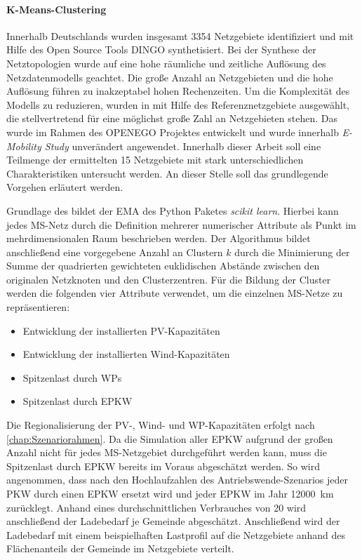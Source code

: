 \paragraph{K-Means-Clustering}

Innerhalb Deutschlands wurden insgesamt \num{3354} Netzgebiete \cite{Schachler} identifiziert und mit Hilfe des Open Source Tools \gls{DINGO} synthetisiert.
Bei der Synthese der Netztopologien wurde auf eine hohe räumliche und zeitliche Auflösung des Netzdatenmodells geachtet.
Die große Anzahl an Netzgebieten und die hohe Auflösung führen zu inakzeptabel hohen Rechenzeiten.
Um die Komplexität des Modells zu reduzieren, wurden in  mit Hilfe des \kmeans Referenznetzgebiete ausgewählt, die stellvertretend für eine möglichst große Zahl an Netzgebieten stehen.
Das \kmean wurde im Rahmen des \gls{OPENEGO} Projektes \cite{Mueller2019} entwickelt und wurde innerhalb \textit{E-Mobility Study} \cite{Schachler} unverändert angewendet.
Innerhalb dieser Arbeit soll eine Teilmenge der ermittelten \num{15} Netzgebiete mit stark unterschiedlichen Charakteristiken untersucht werden.
An dieser Stelle soll das grundlegende Vorgehen erläutert werden. \medskip

Grundlage des \kmeans bildet der \gls{EMA} des Python Paketes \textit{scikit learn}. \cite{scikit-learn2011}
Hierbei kann jedes \gls{MS}-Netz durch die Definition mehrerer numerischer Attribute als Punkt im mehrdimensionalen Raum beschrieben werden.
Der Algorithmus bildet anschließend eine vorgegebene Anzahl an Clustern $k$ durch die Minimierung der Summe der quadrierten gewichteten euklidischen Abstände zwischen den originalen Netzknoten und den Clusterzentren.
Für die Bildung der Cluster werden die folgenden vier Attribute verwendet, um die einzelnen \gls{MS}-Netze zu repräsentieren:

\begin{itemize}
	\item Entwicklung der installierten \gls{PV}-Kapazitäten
	\item Entwicklung der installierten Wind-Kapazitäten
	\item Spitzenlast durch \glspl{WP}
	\item Spitzenlast durch \gls{EPKW}
\end{itemize}

Die Regionalisierung der \gls{PV}-, Wind- und \gls{WP}-Kapazitäten erfolgt nach \autoref{chap:Szenariorahmen}.
Da die Simulation aller \gls{EPKW} aufgrund der großen Anzahl nicht für jedes \gls{MS}-Netzgebiet durchgeführt werden kann, muss die Spitzenlast durch \gls{EPKW} bereits im Voraus abgeschätzt werden.
So wird angenommen, dass nach den Hochlaufzahlen des Antriebswende-Szenarios jeder \gls{PKW} durch einen \gls{EPKW} ersetzt wird und jeder \gls{EPKW} im Jahr \SI{12000}{\km} zurücklegt.
Anhand eines durchschnittlichen Verbrauches von \SI{20}{\kwhkm} wird anschließend der Ladebedarf je Gemeinde abgeschätzt.
Anschließend wird der Ladebedarf mit einem beispielhaften Lastprofil auf die Netzgebiete anhand des Flächenanteils der Gemeinde im Netzgebiete verteilt.


